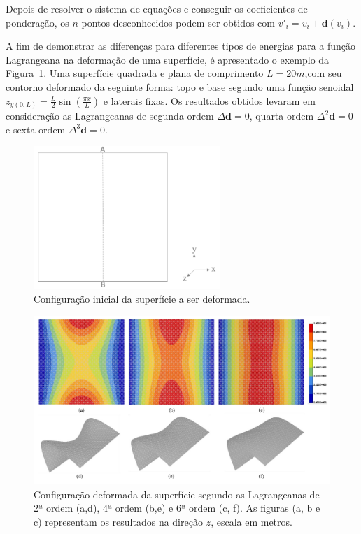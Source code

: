 Depois de resolver o sistema de equações e conseguir os coeficientes de ponderação, os $n$ pontos desconhecidos podem ser obtidos com $v'_i=v_i+\boldsymbol{d}(v_i)$.

A fim de demonstrar as diferenças para diferentes tipos de energias para a função Lagrangeana na deformação de uma superfície, é apresentado o exemplo da Figura~\ref{fig-eg-surf-deformer-1}. Uma superfície quadrada e plana de comprimento $L=20m$,com seu contorno deformado da seguinte forma: topo e base segundo uma função senoidal $z_{y(0,L)}=\frac{L}{2}\sin(\frac{\pi x}{L})$ e laterais fixas. Os resultados obtidos levaram em consideração as Lagrangeanas de segunda ordem $\Delta\boldsymbol{d}=0$, quarta ordem $\Delta^2\boldsymbol{d}=0$ e sexta ordem $\Delta^3\boldsymbol{d}=0$.

\begin{figure} [H]
  \begin{center}
    \includegraphics[width=200pt]{images/fig-eg-surf-deformer-1}
    \caption{Configuração inicial da superfície a ser deformada.~\cite{Muller}}\label{fig-eg-surf-deformer-1}
  \end{center}
\end{figure}


\begin{figure} [H]
  \begin{center}
    \includegraphics[width=\textwidth]{images/fig-eg-surf-deformer-2}
    \caption{Configuração deformada da superfície segundo as Lagrangeanas de 2ª ordem (a,d), 4ª ordem (b,e) e 6ª ordem (c, f). As figuras (a, b e c) representam os resultados na direção $z$, escala em metros.\cite{Muller}}\label{fig-eg-surf-deformer-2}
  \end{center}
\end{figure}

